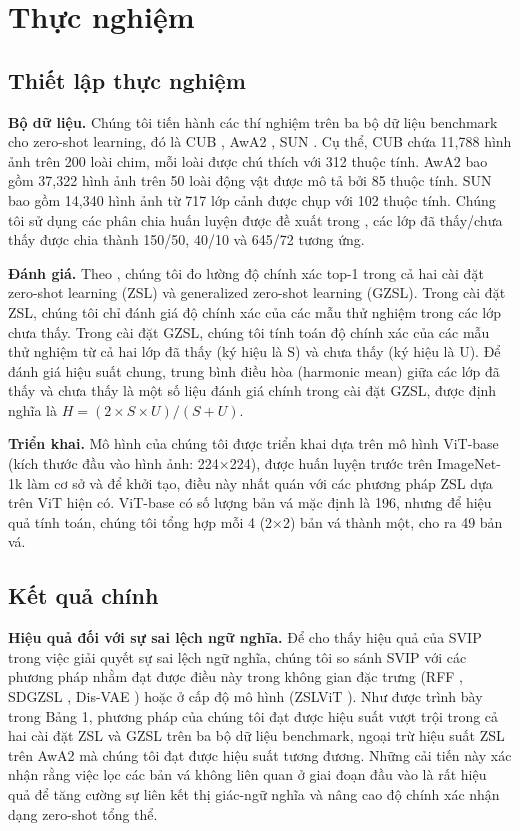 \section{Thực nghiệm}

\subsection{Thiết lập thực nghiệm}
\textbf{Bộ dữ liệu.} Chúng tôi tiến hành các thí nghiệm trên ba bộ dữ liệu benchmark cho zero-shot learning, đó là CUB \cite{49}, AwA2 \cite{29}, SUN \cite{38}. Cụ thể, CUB chứa 11,788 hình ảnh trên 200 loài chim, mỗi loài được chú thích với 312 thuộc tính. AwA2 bao gồm 37,322 hình ảnh trên 50 loài động vật được mô tả bởi 85 thuộc tính. SUN bao gồm 14,340 hình ảnh từ 717 lớp cảnh được chụp với 102 thuộc tính. Chúng tôi sử dụng các phân chia huấn luyện được đề xuất trong \cite{60}, các lớp đã thấy/chưa thấy được chia thành 150/50, 40/10 và 645/72 tương ứng.

\textbf{Đánh giá.} Theo \cite{59}, chúng tôi đo lường độ chính xác top-1 trong cả hai cài đặt zero-shot learning (ZSL) và generalized zero-shot learning (GZSL). Trong cài đặt ZSL, chúng tôi chỉ đánh giá độ chính xác của các mẫu thử nghiệm trong các lớp chưa thấy. Trong cài đặt GZSL, chúng tôi tính toán độ chính xác của các mẫu thử nghiệm từ cả hai lớp đã thấy (ký hiệu là S) và chưa thấy (ký hiệu là U). Để đánh giá hiệu suất chung, trung bình điều hòa (harmonic mean) giữa các lớp đã thấy và chưa thấy là một số liệu đánh giá chính trong cài đặt GZSL, được định nghĩa là $H = (2 \times S \times U) / (S + U)$.

\textbf{Triển khai.} Mô hình của chúng tôi được triển khai dựa trên mô hình ViT-base \cite{47} (kích thước đầu vào hình ảnh: 224$\times$224), được huấn luyện trước trên ImageNet-1k làm cơ sở và để khởi tạo, điều này nhất quán với các phương pháp ZSL dựa trên ViT hiện có. ViT-base có số lượng bản vá mặc định là 196, nhưng để hiệu quả tính toán, chúng tôi tổng hợp mỗi 4 (2$\times$2) bản vá thành một, cho ra 49 bản vá.

\subsection{Kết quả chính}
\textbf{Hiệu quả đối với sự sai lệch ngữ nghĩa.} Để cho thấy hiệu quả của SVIP trong việc giải quyết sự sai lệch ngữ nghĩa, chúng tôi so sánh SVIP với các phương pháp nhằm đạt được điều này trong không gian đặc trưng (RFF \cite{27}, SDGZSL \cite{9}, Dis-VAE \cite{30}) hoặc ở cấp độ mô hình (ZSLViT \cite{4}). Như được trình bày trong Bảng 1, phương pháp của chúng tôi đạt được hiệu suất vượt trội trong cả hai cài đặt ZSL và GZSL trên ba bộ dữ liệu benchmark, ngoại trừ hiệu suất ZSL trên AwA2 mà chúng tôi đạt được hiệu suất tương đương. Những cải tiến này xác nhận rằng việc lọc các bản vá không liên quan ở giai đoạn đầu vào là rất hiệu quả để tăng cường sự liên kết thị giác-ngữ nghĩa và nâng cao độ chính xác nhận dạng zero-shot tổng thể.


